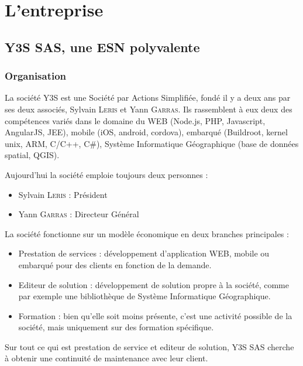 \chapter{L'entreprise}
\label{chap:y3s}

\section{Y3S SAS, une ESN polyvalente}

\subsection{Organisation}
La société Y3S est une Société par Actions Simplifiée, fondé il y a deux ans par ses deux associés, Sylvain \textsc{Leris} et Yann \textsc{Garras}. Ils rassemblent à eux deux des compétences variés dans le domaine du WEB (Node.js, PHP, Javascript, AngularJS, JEE), mobile (iOS, android, cordova), embarqué (Buildroot, kernel unix, ARM, C/C++, C\#), Système Informatique Géographique (base de données spatial, QGIS).


Aujourd'hui la société emploie toujours deux personnes :
\begin{itemize}
    \item Sylvain \textsc{Leris} : Président
    \item Yann \textsc{Garras} : Directeur Général
\end{itemize}

La société fonctionne sur un modèle économique en deux branches principales :
\begin{itemize}
    \item Prestation de services : développement d'application WEB, mobile ou embarqué pour des clients en fonction de la demande.
    \item Editeur de solution : développement de solution propre à la société, comme par exemple une bibliothèque de Système Informatique Géographique.
    \item Formation : bien qu'elle soit moins présente, c'est une activité possible de la société, mais uniquement sur des formation spécifique. 
\end{itemize}

Sur tout ce qui est prestation de service et editeur de solution, Y3S SAS cherche à obtenir une continuité de maintenance avec leur client.

